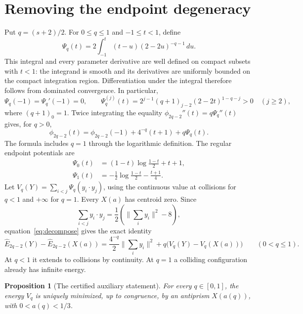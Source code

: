\documentclass[11pt,reqno]{amsart}
\newtheorem{proposition}[theorem]{Proposition}
\theoremstyle{remark}\newtheorem{remark}[theorem]{Remark}
\newcommand{\norm}[1]{\lVert#1\rVert}
\newcommand{\Eh}{\widehat E}
\numberwithin{equation}{section}
\begin{document}
\section{Removing the endpoint degeneracy}
Put $q=(s+2)/2$. For $0\le q\le1$ and $-1\le t<1$, define
\begin{equation}\label{eq:integral}
 \Psi_q(t)=2\int_{-1}^t(t-u)(2-2u)^{-q-1}\,du.
\end{equation}
This integral and every parameter derivative are well defined on compact
subsets with $t<1$: the integrand is smooth and its derivatives are uniformly
bounded on the compact integration region. Differentiation under the integral
therefore follows from dominated convergence. In particular,
\begin{equation}\label{eq:derivatives}
 \Psi_q(-1)=\Psi_q'(-1)=0,\qquad
 \Psi_q^{(j)}(t)=2^{j-1}(q+1)_{j-2}(2-2t)^{1-q-j}>0\quad(j\ge2),
\end{equation}
where $(q+1)_0=1$. Twice integrating the equality
$\phi_{2q-2}''(t)=q\Psi_q''(t)$ gives, for $q>0$,
\begin{equation}\label{eq:decompose}
 \phi_{2q-2}(t)=\phi_{2q-2}(-1)+4^{-q}(t+1)+q\Psi_q(t).
\end{equation}
The formula includes $q=1$ through the logarithmic definition. The regular
endpoint potentials are
\begin{align}
 \Psi_0(t)&=(1-t)\log\frac{1-t}{2}+t+1,\label{eq:end0}\\
 \Psi_1(t)&=-\frac12\log\frac{1-t}{2}-\frac{t+1}{4}.\label{eq:end1}
\end{align}
Let $V_q(Y)=\sum_{i<j}\Psi_q(y_i\cdot y_j)$, using the continuous value at
collisions for $q<1$ and $+\infty$ for $q=1$. Every $X(a)$ has centroid zero.
Since
\[
 \sum_{i<j}y_i\cdot y_j=\frac12\left(\norm{\sum_i y_i}^2-8\right),
\]
equation~\eqref{eq:decompose} gives the exact identity
\begin{equation}\label{eq:centroid}
 \Eh_{2q-2}(Y)-\Eh_{2q-2}(X(a))
 =\frac{4^{-q}}2\norm{\sum_i y_i}^2
   +q\bigl(V_q(Y)-V_q(X(a))\bigr)\qquad(0<q\le1).
\end{equation}
At $q<1$ it extends to collisions by continuity. At $q=1$ a colliding
configuration already has infinite energy.

\begin{proposition}[The certified auxiliary statement]\label{prop:aux}
For every $q\in[0,1]$, the energy $V_q$ is uniquely minimized, up to congruence,
by an antiprism $X(a(q))$, with $0<a(q)<1/3$.
\end{proposition}
\end{document}
